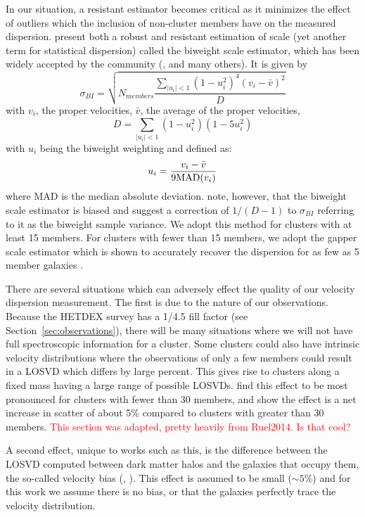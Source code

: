 \documentclass[apj, revtex4]{emulateapj}
\newcommand{\editorial}[1]{\textcolor{red}{#1}}
\newcommand{\citeeg}[1]{(\eg, \citealt{#1})}
\begin{document}
In our situation, a resistant estimator becomes critical as it minimizes the effect of outliers which the inclusion of non-cluster members have on the measured dispersion. \cite{Beers1990} present both a robust and resistant estimation of scale (yet another term for statistical dispersion) called the biweight scale estimator, which has been widely accepted by the community (\eg, \citealt{Milvang-Jensen2008, Owers2011, Murphy2011} and many others). It is given by 
\begin{equation}
	\sigma_{BI} = \sqrt{ N_{members} \frac{ \sum_{|u_i|<1} (1-u_i^2)^4 (v_i - \bar{v})^2} {D} }
\end{equation}
with $v_i$, the proper velocities, $\bar{v}$, the average of the proper velocities,
\begin{equation}
	D = \sum_{|u_i|<1} (1-u_i^2)(1-5u_i^2)
\end{equation}
with $u_i$ being the biweight weighting and defined as:
\begin{equation}
	u_i = \frac{v_i - \bar{v}}{9 {\rm MAD}(v_i)}
\end{equation}
where MAD is the median absolute deviation. \cite{Ruel2014} note, however, that the biweight scale estimator is biased and suggest a correction of $1/(D-1)$ to $\sigma_{BI}$ referring to it as the biweight sample variance. We adopt this method for clusters with at least 15 members. For clusters with fewer than 15 members, we adopt the gapper scale estimator \citep{Beers1990} which is shown to accurately recover the dispersion for as few as 5 member galaxies \citep{Hou2009}.

There are several situations which can adversely effect the quality of our velocity dispersion measurement. The first is due to the nature of our observations. Because the HETDEX survey has a 1/4.5 fill factor (see Section~\ref{sec:observations}), there will be many situations where we will not have full spectroscopic information for a cluster. Some clusters could also have intrinsic velocity distributions where the observations of only a few members could result in a LOSVD which differs by large percent. This gives rise to clusters along a fixed mass having a large range of possible LOSVDs. \cite{Saro2013} find this effect to be most pronounced for clusters with fewer than 30 members, and \cite{Ruel2014} show the effect is a net increase in scatter of about 5\% compared to clusters with greater than 30 members. \editorial{This section was adapted, pretty heavily from Ruel2014. Is that cool?}

A second effect, unique to works such as this, is the difference between the LOSVD computed between dark matter halos and the galaxies that occupy them, the so-called velocity bias \citeeg{Evrard2008, White2010}. This effect is assumed to be small ($\sim5\%$) and for this work we assume there is no bias, or that the galaxies perfectly trace the velocity distribution.
\end{document}
